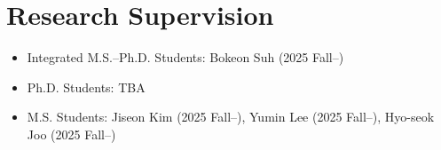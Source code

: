 \section{Research Supervision}

\begin{itemize}[label=$\cdot$]
  \item Integrated M.S.–Ph.D. Students: Bokeon Suh (2025 Fall--)
  \item Ph.D. Students: TBA
  \item M.S. Students: Jiseon Kim (2025 Fall--), Yumin Lee (2025 Fall--), Hyo-seok Joo (2025 Fall--)
\end{itemize}